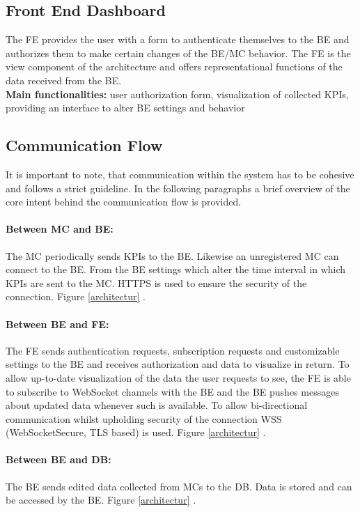 \documentclass{scrreprt}
\newcommand*\circled[1]{\tikz[baseline=(char.base)]{
		\node[shape=circle,draw,inner sep=2pt] (char) {#1};}}
\begin{document}
\subsection{Front End Dashboard}
The FE provides the user with a form to authenticate themselves to the BE and authorizes them to make certain changes of the BE/MC behavior. The FE is the view component of the architecture and offers representational functions of the data received from the BE. \\
\textbf{Main functionalities:} user authorization form, visualization of collected KPIs, providing an interface to alter BE settings and behavior 

\subsection{Communication Flow} 
It is important to note, that communication within the system has to be cohesive and follows a strict guideline. In the following paragraphs a brief overview of the core intent behind the communication flow is provided.
\paragraph{Between MC and BE:}The MC periodically sends KPIs to the BE. Likewise an unregistered MC can connect to the BE. From the BE settings which alter the time interval in which KPIs are sent to the MC. HTTPS is used to ensure the security of the connection. Figure \ref{architectur} \circled{1}.
\paragraph{Between BE and FE:} The FE sends authentication requests, subscription requests and customizable settings to the BE and receives authorization and data to visualize in return. To allow up-to-date visualization of the data the user requests to see, the FE is able to subscribe to WebSocket channels with the BE and the BE pushes messages about updated data whenever such is available. To allow bi-directional communication whilst upholding security of the connection WSS (WebSocketSecure, TLS based) is used. Figure \ref{architectur} \circled{2}.
\paragraph{Between BE and DB:}The BE sends edited data collected from MCs to the DB. Data is stored and can be accessed by the BE. Figure \ref{architectur} \circled{3}.
\end{document}
